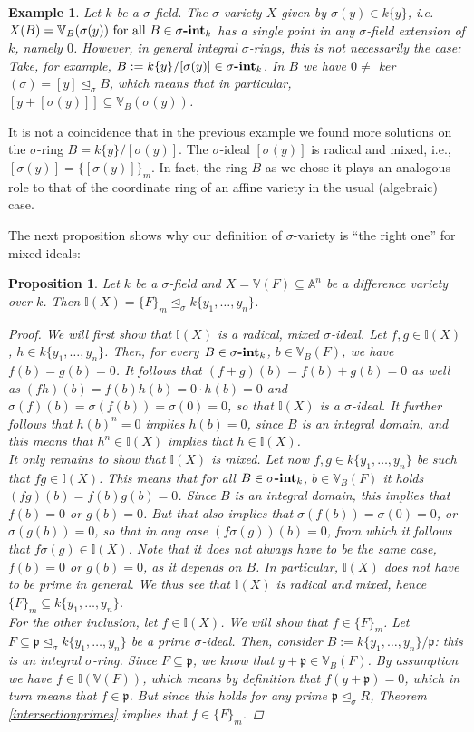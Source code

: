 \documentclass{article}
\def\I{\mathbb{I}}
\def\VV{\mathbb{V}}
\def\p{\mathfrak{p}}
\def\s{\sigma}
\def\si{\unlhd_{\sigma}}
\def\fa{\text{ for all }}
\newcommand{\catname}[1]{{\normalfont\textbf{#1}}}
\newcommand{\sintk}{\s\text{\catname{-int}}_k}
\newenvironment{bew}{\begin{proof}[Proof]}{\end{proof}}
\theoremstyle{plain}
\newtheorem{ex}[Satz]{Example}
\newtheorem{prop}[Satz]{Proposition}
\theoremstyle{definition}
\begin{document}
\begin{ex}
Let $k$ be a $\s$-field. The $\s$-variety $X$ given by $\s(y) \in k\{y\}$, i.e. $X(B) = \VV_B(\s(y)) \fa B \in \sintk$ has a single point in any $\s$-field extension of $k$, namely $0$. However, in general integral $\s$-rings,
this is not necessarily the case: Take, for example, $B:= k\{y\}/[\s(y)] \in \sintk$. In $B$ we have $0 \neq $ ker$(\s) = [y] \si B$, which means that in particular, $[y + [\s(y)]] \subseteq \VV_B(\s(y))$.
\end{ex}

It is not a coincidence that in the previous example we found more solutions on the $\s$-ring $B = k\{y\}/[\s(y)]$. The $\s$-ideal $[\s(y)]$ is radical and mixed, i.e., $[\s(y)] = \{ [\s(y)] \}_m$.
In fact, the ring $B$ as we chose it plays an analogous role to that of the coordinate ring of an affine variety in the usual (algebraic) case.

The next proposition shows why our definition of $\s$-variety is ``the right one'' for mixed ideals:

\begin{prop}\label{I=F_m}
Let $k$ be a $\s$-field and $X = \VV(F) \subseteq \mathbb{A}^n$ be a difference variety over $k$. Then $\I(X) = \{F\}_m \si k\{y_1,\ldots,y_n\}$. 
\begin{bew}
We will first show that $\I(X)$ is a radical, mixed $\s$-ideal.
Let $f, g \in \I(X)$, $h \in k\{y_1,\ldots,y_n\}$. Then, for every $B \in \sintk$, $b \in \VV_B(F)$, we have $f(b) = g(b) = 0$.
It follows that $(f + g)(b) = f(b) + g(b) = 0$ as well as $(fh)(b) = f(b)h(b) = 0 \cdot h(b) = 0$ and $\s(f)(b) = \s(f(b)) = \s(0) = 0$, so that $\I(X)$ is a $\s$-ideal.
It further follows that $h(b)^n = 0$ implies $h(b) = 0$, since $B$ is an integral domain, and this means that $h^n \in \I(X)$ implies that $ h \in \I(X)$. \\
\indent It only remains to show that $\I(X)$ is mixed. Let now $f,g \in k\{y_1,\ldots,y_n\}$ be such that $fg \in \I(X)$. This means that for all  $B \in \sintk$, $b \in \VV_B(F)$ it holds
 $(fg)(b) = f(b) g(b) = 0$. Since $B$ is an integral domain,
this implies that $f(b) = 0$ or $g(b) = 0$. But that also implies that $\s(f(b)) = \s(0) = 0$, or $\s(g(b)) = 0$, so that in any case $(f\s(g))(b) = 0$, from which it follows that $f\s(g) \in \I(X)$.
Note that it does not always have to be the same case, $f(b) = 0$ or $g(b) = 0$, as it depends on $B$. In particular, $\I(X)$ does not have to be prime in general. We thus see that $\I(X)$ is radical and mixed, hence $\{F\}_m \subseteq k\{y_1,\ldots,y_n\}$. \\
\indent For the other inclusion, let $f \in \I(X)$. We will show that $f \in \{F\}_m$. Let $F \subseteq \p \si k\{y_1,\ldots,y_n\}$ be a prime $\s$-ideal.
Then, consider $B:= k\{y_1,\ldots,y_n\}/\p$: this is an integral $\s$-ring. Since $F \subseteq \p$, we know that $y + \p \in \VV_B(F)$. By assumption we have $f \in \I(\VV(F))$, which means by definition that $f(y + \p) = 0$, which
in turn means that $f \in \p$. But since this holds for any prime $\p \si R$, Theorem \ref{intersectionprimes} implies that $f \in \{F\}_m$.
\end{bew}
\end{prop}
\end{document}
